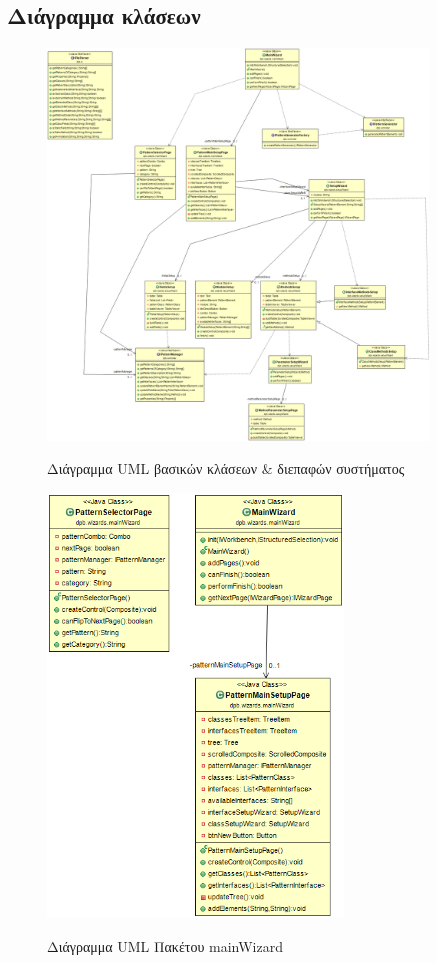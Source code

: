 \subsection{Διάγραμμα κλάσεων}
\begin{figure}[H]
    \centering
    \includegraphics[width=0.9\textwidth]{Figures/system.png}
    \label{fig:systemUML}
    \caption{Διάγραμμα UML βασικών κλάσεων \& διεπαφών συστήματος}
\end{figure}
\begin{figure}[H]
    \centering
    \includegraphics[width=0.7\textwidth]{Figures/mainWizard.png}
    \label{fig:mainWizardUML}
    \caption{Διάγραμμα UML Πακέτου mainWizard}
\end{figure}
